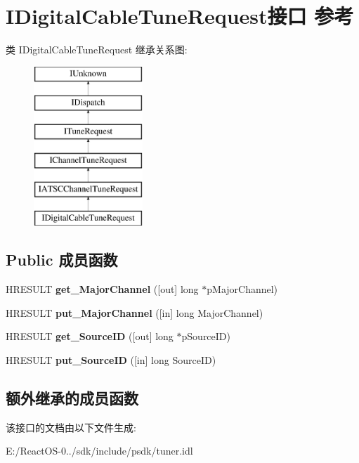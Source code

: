 \hypertarget{interface_i_digital_cable_tune_request}{}\section{I\+Digital\+Cable\+Tune\+Request接口 参考}
\label{interface_i_digital_cable_tune_request}
类 I\+Digital\+Cable\+Tune\+Request 继承关系图\+:\begin{figure}[H]
\begin{center}
\leavevmode
\includegraphics[height=6.000000cm]{interface_i_digital_cable_tune_request}
\end{center}
\end{figure}
\subsection*{Public 成员函数}
\begin{DoxyCompactItemize}
\item 
\mbox{\label{interface_i_digital_cable_tune_request_a85a950725a729c434456b191593eb22a}} 
H\+R\+E\+S\+U\+LT {\bfseries get\+\_\+\+Major\+Channel} (\mbox{[}out\mbox{]} long $\ast$p\+Major\+Channel)
\item 
\mbox{\label{interface_i_digital_cable_tune_request_a3ab52c8ee90023cf966a3e8451af4986}} 
H\+R\+E\+S\+U\+LT {\bfseries put\+\_\+\+Major\+Channel} (\mbox{[}in\mbox{]} long Major\+Channel)
\item 
\mbox{\label{interface_i_digital_cable_tune_request_ab51e0e842a8b19c65e96867240708773}} 
H\+R\+E\+S\+U\+LT {\bfseries get\+\_\+\+Source\+ID} (\mbox{[}out\mbox{]} long $\ast$p\+Source\+ID)
\item 
\mbox{\label{interface_i_digital_cable_tune_request_a52749e35649a56241a1f4984779d0126}} 
H\+R\+E\+S\+U\+LT {\bfseries put\+\_\+\+Source\+ID} (\mbox{[}in\mbox{]} long Source\+ID)
\end{DoxyCompactItemize}
\subsection*{额外继承的成员函数}


该接口的文档由以下文件生成\+:\begin{DoxyCompactItemize}
\item 
E\+:/\+React\+O\+S-\/0../sdk/include/psdk/tuner.\+idl\end{DoxyCompactItemize}
